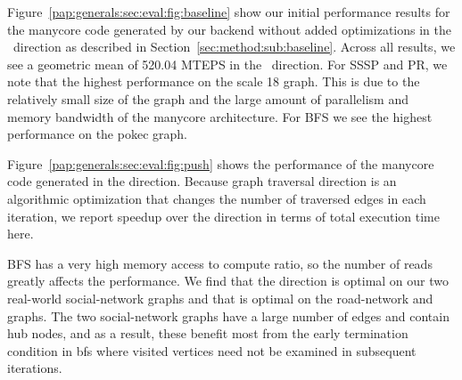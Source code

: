 Figure~\ref{pap:generals:sec:eval:fig:baseline} show our initial performance results for the manycore code generated by our backend without added optimizations in the \pull~direction as described in Section~\ref{sec:method:sub:baseline}.
Across all results, we see a geometric mean of 520.04 MTEPS in the \pull~direction.%
For SSSP and PR, we note that the highest performance on the \kron scale 18 graph.
This is due to the relatively small size of the graph and the large amount of parallelism and memory bandwidth of the manycore architecture.
For BFS we see the highest performance on the pokec graph.
 
Figure~\ref{pap:generals:sec:eval:fig:push} shows the performance of the manycore code generated in the \push direction.
Because graph traversal direction is an algorithmic optimization that changes the number of traversed edges in each iteration, we report speedup over the \pull direction in terms of total execution time here.

BFS has a very high memory access to compute ratio, so the number of reads greatly affects the performance.
We find that the \pull direction is optimal on our two real-world social-network graphs and that \push is optimal on the road-network and \kron graphs.
The two social-network graphs have a large number of edges and contain hub nodes, and as a result, these benefit most from the early termination condition in bfs \pull where visited vertices need not be examined in subsequent iterations.
 
